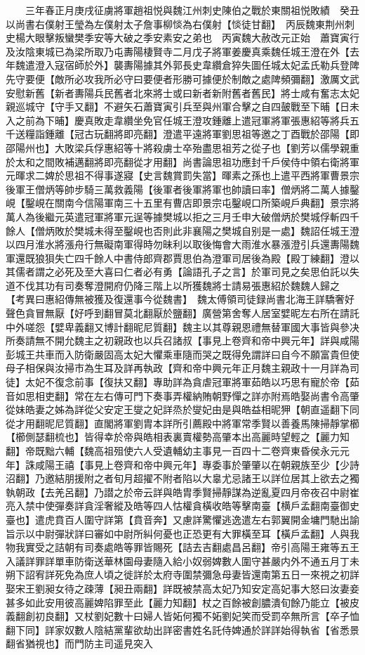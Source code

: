 　　三年春正月庚戌征虜將軍趙祖悦與魏江州刺史陳伯之戰於東關祖悦敗績　癸丑以尚書右僕射王瑩為左僕射太子詹事柳惔為右僕射【惔徒甘翻】　丙辰魏東荆州刺史楊大眼擊叛蠻樊季安等大破之季安素安之弟也　丙寅魏大赦改元正始　蕭寶寅行及汝陰東城已為梁所取乃屯夀陽棲賢寺二月戊子將軍姜慶真乘魏任城王澄在外【去年魏遣澄入寇宿師於外】襲夀陽據其外郭長史韋纘倉猝失圖任城太妃孟氏勒兵登陴先守要便【敵所必攻我所必守曰要便者形勝可據便於制敵之處陴頻彌翻】激厲文武安慰新舊【新者夀陽兵民舊者北來將士或曰新者新附舊者舊民】將士咸有奮志太妃親巡城守【守手又翻】不避矢石蕭寶寅引兵至與州軍合擊之自四皷戰至下晡【日未入之前為下晡】慶真敗走韋纘坐免官任城王澄攻鍾離上遣冠軍將軍張惠紹等將兵五千送糧詣鍾離【冠古玩翻將即亮翻】澄遣平遠將軍劉思祖等邀之丁酉戰於邵陽【即邵陽州也】大敗梁兵俘惠紹等十將殺虜士卒殆盡思祖芳之從子也【劉芳以儒學親重於太和之間敗補邁翻將即亮翻從才用翻】尚書論思祖功應封千戶侯侍中領右衛將軍元暉求二婢於思祖不得事遂寢【史言魏賞罰失當】暉素之孫也上遣平西將軍曹景宗後軍王僧炳等帥步騎三萬救義陽【後軍者後軍將軍也帥讀曰率】僧炳將二萬人據鑿峴【鑿峴在關南今信陽軍南三十五里有曹店即景宗屯鑿峴口所築峴戶典翻】景宗將萬人為後繼元英遣冠軍將軍元逞等據樊城以拒之三月壬申大破僧炳於樊城俘斬四千餘人【僧炳敗於樊城未得至鑿峴也否則此非襄陽之樊城自别是一處】魏詔任城王澄以四月淮水將漲舟行無礙南軍得時勿昧利以取後悔會大雨淮水暴漲澄引兵還夀陽魏軍還既狼狽失亡四千餘人中書侍郎齊郡賈思伯為澄軍司居後為殿【殿丁練翻】澄以其儒者謂之必死及至大喜曰仁者必有勇【論語孔子之言】於軍司見之矣思伯託以失道不伐其功有司奏奪澄開府仍降三階上以所獲魏將士請易張惠紹於魏魏人歸之　【考異曰惠紹傳無被獲及復還事今從魏書】　魏太傅領司徒録尚書北海王詳驕奢好聲色貪冒無厭【好呼到翻冒莫北翻厭於鹽翻】廣營第舍奪人居室嬖昵左右所在請託中外嗟怨【嬖卑義翻又博計翻昵尼質翻】魏主以其尊親恩禮無替軍國大事皆與參决所奏請無不開允魏主之初親政也以兵召諸叔【事見上卷齊和帝中興元年】詳與咸陽彭城王共車而入防衛嚴固高太妃大懼乘車隨而哭之既得免謂詳曰自今不願富貴但使母子相保與汝掃市為生耳及詳再執政【齊和帝中興元年正月魏主親政十一月詳為司徒】太妃不復念前事【復扶又翻】專助詳為貪虐冠軍將軍茹皓以巧思有寵於帝【茹音如思相吏翻】常在左右傳可門下奏事弄權納賄朝野憚之詳亦附焉皓娶尚書令高肇從妹皓妻之姊為詳從父安定王燮之妃詳烝於燮妃由是與皓益相昵狎【朝直遥翻下同從才用翻昵尼質翻】直閣將軍劉胄本詳所引薦殿中將軍常季賢以善養馬陳掃靜掌櫛【櫛側瑟翻梳也】皆得幸於帝與皓相表裏賣權勢高肇本出高麗時望輕之【麗力知翻】帝既黜六輔【魏高祖殂使六人受遺輔幼主事見一百四十二卷齊東昏侯永元元年】誅咸陽王禧【事見上卷齊和帝中興元年】專委事於肇肇以在朝親族至少【少詩沼翻】乃邀結朋援附之者旬月超擢不附者陷以大辠尤忌諸王以詳位居其上欲去之獨執朝政【去羌呂翻】乃譛之於帝云詳與皓胄季賢掃靜謀為逆亂夏四月帝夜召中尉崔亮入禁中使彈奏詳貪淫奢縱及皓等四人怙權貪橫收皓等擊南臺【横戶孟翻南臺御史臺也】遣虎賁百人圍守詳第【賁音奔】又慮詳驚懼逃逸遣左右郭翼開金墉門馳出諭旨示以中尉彈狀詳曰審如中尉所糾何憂也正恐更有大罪橫至耳【橫戶孟翻】人與我物我實受之詰朝有司奏處皓等罪皆賜死【詰去吉翻處昌呂翻】帝引高陽王雍等五王入議詳罪詳單車防衛送華林園母妻隨入給小奴弱婢數人圍守甚嚴内外不通五月丁未朔下詔宥詳死免為庶人頃之徙詳於太府寺圍禁彌急母妻皆還南第五日一來視之初詳娶宋王劉昶女待之疎薄【昶丑兩翻】詳既被禁高太妃乃知安定高妃事大怒曰汝妻妾甚多如此安用彼高麗婢陷罪至此【麗力知翻】杖之百餘被創膿潰旬餘乃能立【被皮義翻創初良翻】又杖劉妃數十曰婦人皆妬何獨不妬劉妃笑而受罰卒無所言【卒子恤翻下同】詳家奴數人陰結黨輩欲劫出詳密書姓名託侍婢通於詳詳始得執省【省悉景翻省猶視也】而門防主司遥見突入
